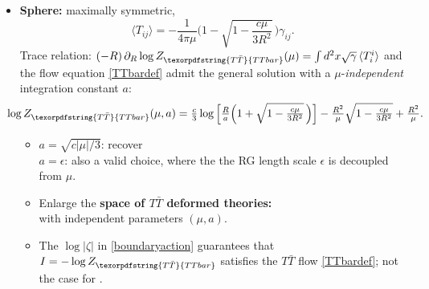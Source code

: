 \documentclass[10pt]{article}
\newcommand{\citations}[1]{{\footnotesize#1\par}}
\newcommand{\TTbar}{\texorpdfstring{\ensuremath{T\bar{T}}}{TTbar}\xspace}
\begin{document}
\begin{multicols}{3}
\begin{itemize}
\item \textbf{Sphere:} maximally symmetric,\\[-1.4\baselineskip]

\hfill\mbox{\footnotesize \textcite{Donnelly:2018bef}}
	\begin{equation}
		\langle T_{ij}\rangle = -\frac{1}{4\pi\mu} \bigg(1-\sqrt{1-\frac{c\mu}{3R^2}}\, \bigg)  \gamma_{ij}.
	\end{equation}
Trace relation: \mbox{$
(-R)\,\partial_R \log Z_{\TTbar}(\mu)=\int d^2x\sqrt{\gamma}\,\langle T^i_i \rangle
$} and the flow equation \eqref{TTbardef} 
admit the general \mbox{solution} with a $\mu$-\textit{independent} integration constant $a$:
	\begin{equation*}\small
	\hspace{-1.3em}
		\log Z_{\TTbar}(\mu, a) = \tfrac{c}{3} \log \Big[\tfrac{R}{a}   \Big(1+\sqrt{1-\tfrac{c \mu }{3  R^2}}\, \Big) \Big] - \tfrac{R^2}{\mu}  \sqrt{1-\tfrac{c \mu }{3 R^2}} + \tfrac{R^2}{\mu}. %
	\end{equation*}
	\begin{itemize}%
	\item $a = \sqrt{c|\mu|/3}$: \mbox{recover {\small
		\textsl{\citeauthor{Donnelly:2018bef}}
		\cite{Donnelly:2018bef}
	}} \\
	$a = \epsilon$: also a valid choice, where the the RG length scale $\epsilon$ is decoupled from $\mu$.
	
	\item Enlarge the \textbf{space of \TTbar deformed theories:}\\
	with \mbox{independent} parameters $(\mu,a)$.
	
	\item The $\log |\zeta|$ in \eqref{boundaryaction} guarantees that $I = -\log Z_{\TTbar}$ \mbox{satisfies} the $T\bar T$ flow \eqref{TTbardef}; not the case for \cite{Donnelly:2018bef}.
	\end{itemize}

	
	\begin{flushright}
		\vspace{-.6\baselineskip}
		\citations{
			\textcite{Caputa:2020lpa}\\
			\textcite{Li:2020zjb}
		}\vspace{-.8\baselineskip}
	\end{flushright}
	

\end{itemize}
\end{multicols}
\end{document}
